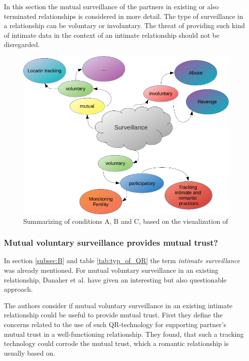 In this section the mutual surveillance of the partners in existing or also terminated relationships is considered in more detail. 
The type of surveillance in a relationship can be voluntary or involuntary. The threat of providing such kind of intimate data in the context of an intimate relationship should not be disregarded.
\begin{figure}[htb]
	\centering
	\includegraphics[width=\linewidth]{img/differences_surveillance.png}
	\caption{Summarizing of conditions A, B and C, based on the visualization of \cite{ethicsOfSurveillance}}
	\label{fig:intimate_surveillance}
\end{figure}

\subsubsection{Mutual voluntary surveillance provides mutual trust?}
In section \ref{subsec:B} and table \ref{tab:typ_of_QR} the term \textit{intimate surveillance} was already mentioned.
For mutual voluntary surveillance in an existing relationship, Danaher et al. \cite{doi:10.1080/15265161.2017.1409823} have given an interesting but also questionable approach.

The authors consider if mutual voluntary surveillance in an existing intimate relationship could be useful to provide mutual trust.
First they define the concerns related to the use of such \acs{QR}-technology for supporting partner's mutual trust in a well-functioning relationship. They found, that such a tracking technology could corrode the mutual trust, which a romantic relationship is usually based on.

